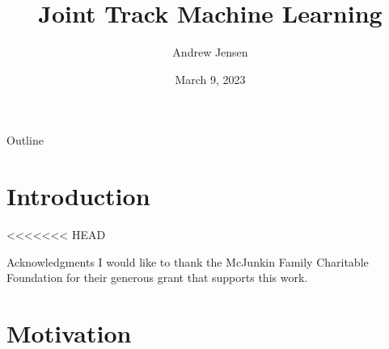 \documentclass[presentation, aspectratio=1610]{beamer}
\author{Andrew Jensen}
\date{March 9, 2023}
\title{Joint Track Machine Learning}
\begin{document}
\maketitle
\begin{frame}{Outline}
\tableofcontents
\end{frame}


\section{Introduction}
<<<<<<< HEAD
\label{sec:org20dc070}
\begin{frame}[label={sec:org8420ddc}]{Acknowledgments}
I would like to thank the McJunkin Family Charitable Foundation for their generous grant that supports this work.
\end{frame}
\section{Motivation}
\label{sec:org8f5cadb}
\end{document}
